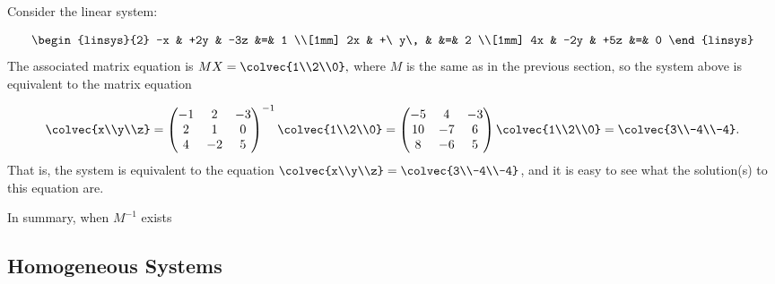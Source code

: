 \begin{example}
Consider the linear system:

\[
      \begin{linsys}{2}
            -x & +2y & -3z         &=& 1  \\[1mm]
            2x & +\ y\,   &             &=& 2 \\[1mm]
            4x & -2y & +5z         &=& 0  
      \end{linsys}
\]
The associated matrix equation is $MX=\colvec{1\\2\\0},$ where \(M\) is the same as in the previous section, so the system above is equivalent to the matrix equation

\[
\colvec{x\\y\\z}=\begin{pmatrix}
-1 & 2 & -3 \\
2 & 1 & 0 \\
4 & -2 & 5 \\
\end{pmatrix}^{-1}\colvec{1\\2\\0}
=\begin{pmatrix}
-5 & 4 & -3 \\
10 & -7 & 6 \\
 8 & -6 & 5 \\
\end{pmatrix}\colvec{1\\2\\0}
=\colvec{3\\-4\\-4}.
\]
That is, the system is equivalent to the equation $\colvec{x\\y\\z}=\colvec{3\\-4\\-4}$, and it is easy to see what the solution(s) to this equation are. 
\end{example}
In summary, when $M^{-1}$ exists 

\begin{center}
\end{center}



\subsection{Homogeneous Systems}

